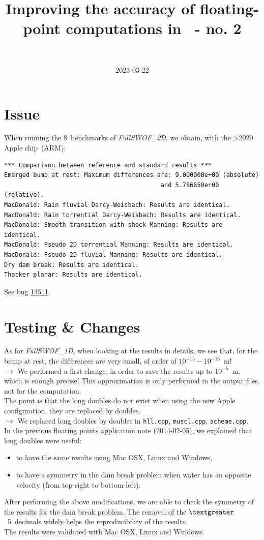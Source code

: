 \documentclass[a4paper, 11pt]{article}
\title{Improving the accuracy of floating-point computations
in~\FullSWOF{} - no. 2}
\author{\contactFullName\\ \contactEmail}
\date{2023-03-22} %
\newcommand{\FullSWOF}{\emph{FullSWOF\_2D}}
\begin{document}
\maketitle

\thispagestyle{fancy}

\section*{Issue}

When running the 8~benchmarks of \FullSWOF{}, we obtain, with the \textgreater 2020 Apple chip~(ARM):
\begin{verbatim}
*** Comparison between reference and standard results ***
Emerged bump at rest: Maximum differences are: 9.000000e+00 (absolute) 
                                           and 5.786650e+00 (relative).
MacDonald: Rain fluvial Darcy-Weisbach: Results are identical.
MacDonald: Rain torrential Darcy-Weisbach: Results are identical.
MacDonald: Smooth transition with shock Manning: Results are identical.
MacDonald: Pseudo 2D torrential Manning: Results are identical.
MacDonald: Pseudo 2D fluvial Manning: Results are identical.
Dry dam break: Results are identical.
Thacker planar: Results are identical.
\end{verbatim}
See bug \href{https://sourcesup.renater.fr/tracker/?func=detail&aid=13511&group_id=895&atid=3706}{13511}. 

\section*{Testing \& Changes}
As for {\emph{FullSWOF\_1D}}, when looking at the results in details, we see that, 
for the bump at rest, the differences are very small, of order of $10^{-13} - 10^{-15}$~m!\\
$\rightarrow$ We performed a first change, in order to save the results up to $10^{-5}$~m, which is enough precise! 
This approximation is only performed in the output files, not for the computation. \\

The point is that the long doubles do not exist when using the new Apple configuration, they are replaced by doubles. \\
$\rightarrow$ We replaced long doubles by doubles in \texttt{hll.cpp}, \texttt{muscl.cpp}, \texttt{scheme.cpp}. \\

In the previous floating points application note (2014-02-05), we explained that long doubles were useful:
\begin{itemize}
\item to have the same results using Mac OSX, Linux and Windows, 
\item to have a symmetry in the dam break problem when water has an opposite velocity (from top-right to bottom-left). 
\end{itemize}
After performing the above modifications, we are able to check the symmetry of the results for the dam break problem.
The removal of the $\textgreater$~5~decimals widely helps the reproducibility of the results. \\
The results were validated with Mac OSX, Linux and Windows. 
\end{document}
